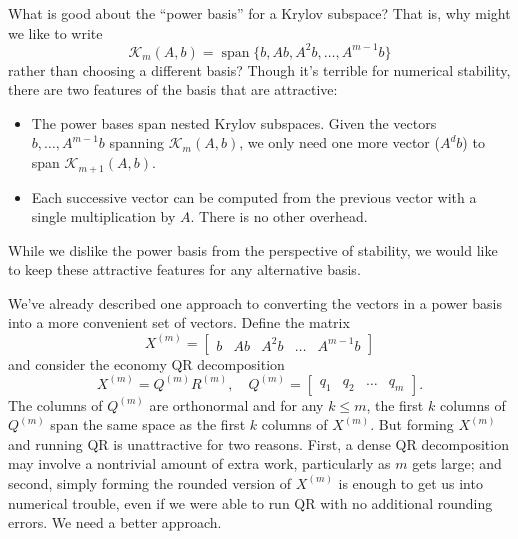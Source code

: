 \documentclass[12pt, leqno]{article}
\newcommand{\calK}{\mathcal{K}}
\begin{document}
What is good about the ``power basis'' for a Krylov subspace?  That is,
why might we like to write
\[
  \calK_m(A,b) = \operatorname{span}\{ b, Ab, A^2b, \ldots, A^{m-1}b \}
\]
rather than choosing a different basis?  Though it's terrible for
numerical stability, there are two features of the basis that are
attractive:
\begin{itemize}
\item
  The power bases span nested Krylov subspaces.  Given the vectors
  $b, \ldots, A^{m-1} b$ spanning $\calK_m(A,b)$, we only need one
  more vector ($A^d b$) to span $\calK_{m+1}(A,b)$.
\item
  Each successive vector can be computed from the previous vector
  with a single multiplication by $A$.  There is no other overhead.
\end{itemize}
While we dislike the power basis from the perspective of stability,
we would like to keep these attractive features for any alternative
basis.

We've already described one approach to converting the vectors in
a power basis into a more convenient set of vectors.  Define the matrix
\[
  X^{(m)} = \begin{bmatrix} b & Ab & A^2 b & \ldots & A^{m-1} b \end{bmatrix}
\]
and consider the economy QR decomposition
\[
X^{(m)} = Q^{(m)} R^{(m)}, \quad
Q^{(m)} = \begin{bmatrix} q_1 & q_2 & \ldots & q_{m} \end{bmatrix}.
\]
The columns of $Q^{(m)}$ are orthonormal and for any $k \leq m$, the
first $k$ columns of $Q^{(m)}$ span the same space as the first $k$
columns of $X^{(m)}$.  But forming $X^{(m)}$ and running QR is
unattractive for two reasons.  First, a dense QR decomposition may
involve a nontrivial amount of extra work, particularly as $m$ gets
large; and second, simply forming the rounded version of $X^{(m)}$ is
enough to get us into numerical trouble, even if we were able to run
QR with no additional rounding errors.  We need a better approach.
\end{document}
